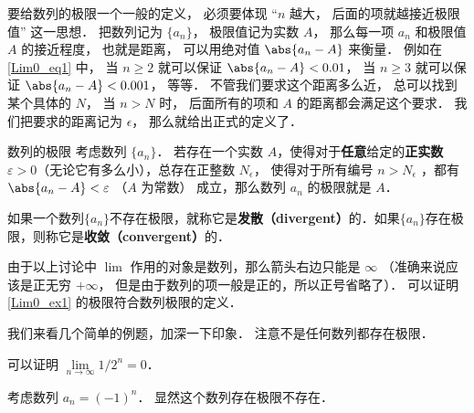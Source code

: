 要给数列的极限一个一般的定义， 必须要体现 “$n$ 越大， 后面的项就越接近极限值” 这一思想． 把数列记为 $\{a_n\}$， 极限值记为实数 $A$， 那么每一项 $a_n$ 和极限值 $A$ 的接近程度， 也就是距离， 可以用绝对值 $\abs{a_n - A}$ 来衡量． 例如在\autoref{Lim0_eq1} 中， 当 $n \ge 2$ 就可以保证 $\abs{a_n - A} < 0.01$， 当 $n \ge 3$ 就可以保证 $\abs{a_n - A} < 0.001$， 等等． 不管我们要求这个距离多么近， 总可以找到某个具体的 $N$， 当 $n > N$ 时， 后面所有的项和 $A$ 的距离都会满足这个要求． 我们把要求的距离记为 $\epsilon$， 那么就给出正式的定义了．

\begin{definition}{数列的极限}\label{Lim0_def2}
考虑数列 $\{a_n\}$． 若存在一个实数 $A$，使得对于\textbf{任意}给定的\textbf{正实数} $\varepsilon > 0$（无论它有多么小），总存在正整数 $N_\epsilon$， 使得对于所有编号 $n>N_\epsilon$ ，都有 $\abs{a_n - A} < \varepsilon$ （$A$ 为常数） 成立，那么数列 $a_n$ 的极限就是 $A$．

如果一个数列$\{a_n\}$不存在极限，就称它是\textbf{发散（divergent）}的．如果$\{a_n\}$存在极限，则称它是\textbf{收敛（convergent）}的．
\end{definition}
由于以上讨论中 $\lim$ 作用的对象是数列，那么箭头右边只能是 $\infty$ （准确来说应该是正无穷 $+\infty$， 但是由于数列的项一般是正的，所以正号省略了）． 可以证明\autoref{Lim0_ex1} 的极限符合数列极限的定义．

我们来看几个简单的例题，加深一下印象． 注意不是任何数列都存在极限．

\begin{example}{}
可以证明 $\lim\limits_{n\to\infty}1/2^n = 0$．
\end{example}

\begin{example}{}\label{Lim0_exe1}
考虑数列 $a_n=(-1)^n$． 显然这个数列存在极限不存在．
\end{example}
